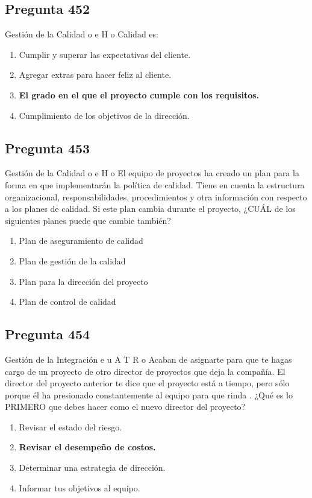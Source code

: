 \documentclass[11pt,a4paper]{article}
\begin{document}
\subsection*{Pregunta 452}
Gestión de la Calidad o e H o Calidad es:

\begin{enumerate}[label=\alph*)]
  \item Cumplir y superar las expectativas del cliente.
  \item Agregar extras para hacer feliz al cliente.
  \item \textbf{El grado en el que el proyecto cumple con los requisitos.}
  \item Cumplimiento de los objetivos de la dirección.
\end{enumerate}

\subsection*{Pregunta 453}
Gestión de la Calidad o e H o El equipo de proyectos ha creado un plan para la forma en que implementarán la política de calidad. Tiene en cuenta la estructura organizacional, responsabilidades, procedimientos y otra información con respecto a los planes de calidad. Si este plan cambia durante el proyecto, ¿CUÁL de los siguientes planes puede que cambie también?

\begin{enumerate}[label=\alph*)]
  \item Plan de aseguramiento de calidad
  \item Plan de gestión de la calidad
  \item Plan para la dirección del proyecto
  \item Plan de control de calidad
\end{enumerate}

\subsection*{Pregunta 454}
Gestión de la Integración e u A T R o Acaban de asignarte para que te hagas cargo de un proyecto de otro director de proyectos que deja la compañía. El director del proyecto anterior te dice que el proyecto está a tiempo, pero sólo porque él ha presionado constantemente al equipo para que rinda . ¿Qué es lo PRIMERO que debes hacer como el nuevo director del proyecto?

\begin{enumerate}[label=\alph*)]
  \item Revisar el estado del riesgo.
  \item \textbf{Revisar el desempeño de costos.}
  \item Determinar una estrategia de dirección.
  \item Informar tus objetivos al equipo.
\end{enumerate}
\end{document}
